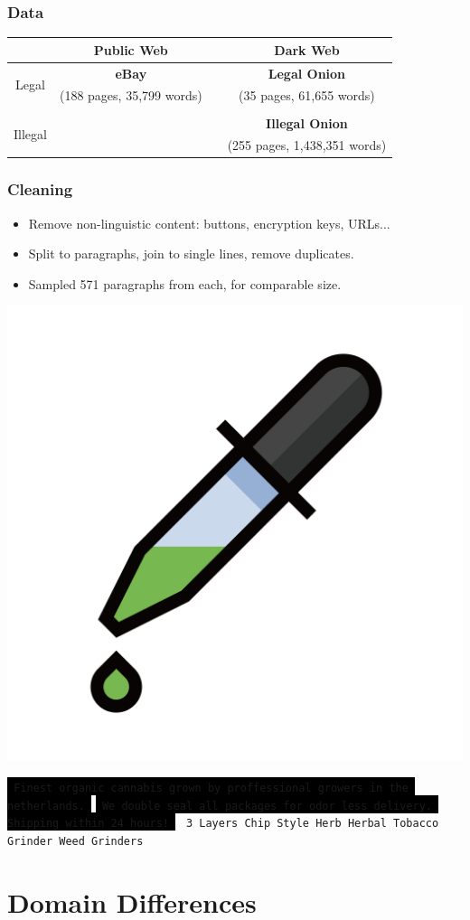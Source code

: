\documentclass[t,xcolor={svgnames,table}]{beamer}
\begin{document}
\begin{frame}
	\frametitle{Data}
	
	\begin{center}
	\def\arraystretch{2}
	\begin{tabular}{c|ccc}
	& Public Web && Dark Web \\ 
	\hline
	\multirow{2}{*}{Legal} & \textbf{\color{yellow} eBay} && \textbf{\color{green} Legal Onion} \\
	& (188 pages, 35,799 words) && (35 pages, 61,655 words) \\\\
	\multirow{2}{*}{Illegal} &&& \textbf{\color{red} Illegal Onion} \\
	&&& (255 pages, 1,438,351 words)
	\end{tabular}
	\end{center}
\end{frame}

\begin{frame}[fragile]
	\frametitle{Cleaning}
	\begin{itemize}\setlength\itemsep{1em}
		\item Remove non-linguistic content: buttons, encryption keys, URLs...
		\item Split to paragraphs, join to single lines, remove duplicates.
		\item Sampled 571 paragraphs from each, for comparable size.
	\end{itemize}
	\begin{center}
	\includegraphics[width=.2\textwidth]{pipette.png}
	\end{center}
	
	\colorbox{black}{\color{OwlGreen}\tt\scriptsize
	Finest organic cannabis grown by proffessional growers in the netherlands.
	}
	\colorbox{black}{\color{OwlGreen}\tt\scriptsize
	We double seal all packages for odor less delivery.	Shipping within 24 hours!
	}
	\colorbox{green!30}{\color{yellow}\tt\scriptsize
	3 Layers  Chip Style Herb Herbal Tobacco Grinder Weed Grinders
	}

\end{frame}

\section{Domain Differences}
\end{document}

